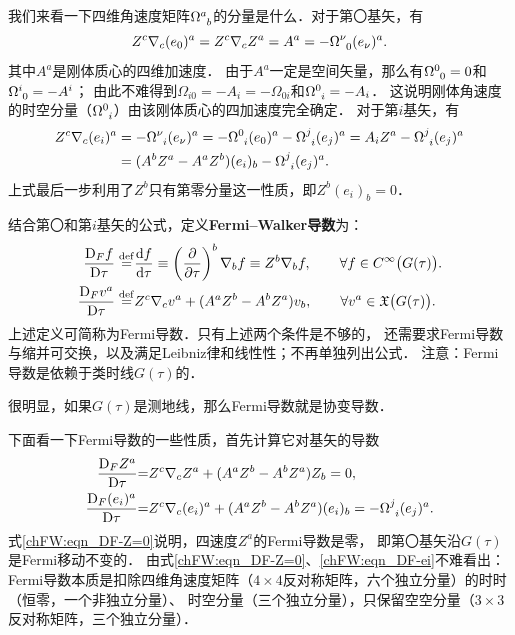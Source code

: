 我们来看一下四维角速度矩阵$\Omega^a_{\hphantom{a} b}$的分量是什么．对于第〇基矢，有
\begin{equation}\label{chFW:eqn_tmp-DZ0}
	Z^c \nabla_c (e_0)^a =Z^c \nabla_c Z^a= A^a =- \Omega^{\nu}_{\hphantom{\nu} 0} (e_\nu)^a .
\end{equation}
其中$A^a$是刚体质心的四维加速度．
由于$A^a$一定是空间矢量，那么有$\Omega^{0}_{\hphantom{0} 0}=0$和$\Omega^{i}_{\hphantom{i} 0}=-A^i$；
由此不难得到$\Omega_{i0}=-A_i=-\Omega_{0i}$和$\Omega^{0}_{\hphantom{0} i}=-A_i$．
这说明刚体角速度的时空分量（$\Omega^{0}_{\hphantom{0} i}$）由该刚体质心的四加速度完全确定．
对于第$i$基矢，有
\begin{equation} \label{chFW:eqn_tmp-Dei}
	\begin{aligned}
		Z^c \nabla_c (e_i)^a &= -\Omega^{\nu}_{\hphantom{\nu} i} (e_\nu)^a
		=-\Omega^{0}_{\hphantom{0} i} (e_0)^a -\Omega^{j}_{\hphantom{j} i} (e_j)^a
		=A_i Z^a -\Omega^{j}_{\hphantom{j} i} (e_j)^a  \\
		&=(A^b Z^a - A^a Z^b) (e_i)_b-\Omega^{j}_{\hphantom{j} i} (e_j)^a  .
	\end{aligned}
\end{equation}
上式最后一步利用了$Z^b$只有第零分量这一性质，即$Z^b(e_i)_b=0$．

结合第〇和第$i$基矢的公式，定义{\bfseries \heiti Fermi--Walker导数}为：
\begin{align}
	\frac{{\rm D}_F f}{{\rm D}\tau} \overset{\mathrm {def}}{=} & \frac{{\rm d} f}{{\rm d}\tau}
	\equiv\left(\frac{\partial}{\partial \tau}\right)^b \nabla_b f
	\equiv Z^b \nabla_b f,
	\qquad \forall f\in C^\infty\bigl(G(\tau)\bigr). \label{chFW:eqn_fermi-walker-fun} \\
	\frac{{\rm D}_F v^a}{{\rm D}\tau} \overset{\mathrm {def}}{=} &
	Z^c \nabla_c v^a +(A^a Z^b-A^b Z^a) v_b ,\qquad
	\forall v^a\in \mathfrak{X}\bigl(G(\tau)\bigr). \label{chFW:eqn_fermi-walker-vec}
\end{align}
上述定义可简称为Fermi导数．只有上述两个条件是不够的，
还需要求Fermi导数与缩并可交换，以及满足Leibniz律和线性性；不再单独列出公式．
注意：Fermi导数是依赖于类时线$G(\tau)$的．

很明显，如果$G(\tau)$是测地线，那么Fermi导数就是协变导数．



下面看一下Fermi导数的一些性质，首先计算它对基矢的导数
\begin{align}
	\frac{{\rm D}_F Z^a}{{\rm D}\tau} &{=} Z^c \nabla_c Z^a +(A^a Z^b-A^b Z^a) Z_b = 0,
	\label{chFW:eqn_DF-Z=0}\\
	\frac{{\rm D}_F (e_i)^a}{{\rm D}\tau} &{=} Z^c \nabla_c (e_i)^a +(A^a Z^b-A^b Z^a) (e_i)_b
	= -\Omega^{j}_{\hphantom{j} i} (e_j)^a . \label{chFW:eqn_DF-ei}
\end{align}
式\eqref{chFW:eqn_DF-Z=0}说明，四速度$Z^a$的Fermi导数是零，
即第〇基矢沿$G(\tau)$是Fermi移动不变的．
由式\eqref{chFW:eqn_DF-Z=0}、\eqref{chFW:eqn_DF-ei}不难看出：
Fermi导数本质是扣除四维角速度矩阵（$4\times 4$反对称矩阵，六个独立分量）的时时（恒零，一个非独立分量）、
时空分量（三个独立分量），只保留空空分量（$3\times 3$反对称矩阵，三个独立分量）．


